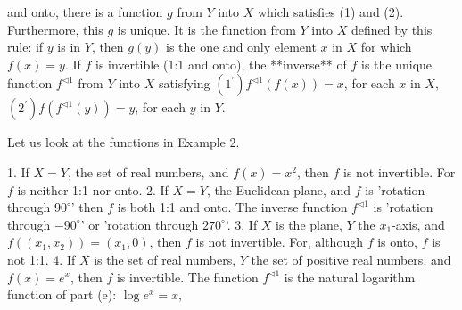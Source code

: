 and onto, there is a function \(g\) from \(Y\) into \(X\) which satisfies (1) and (2). Furthermore, this \(g\) is unique. It is the function from \(Y\) into \(X\) defined by this rule: if \(y\) is in \(Y\), then \(g(y)\) is the one and only element \(x\) in \(X\) for which \(f(x)=y\). If \(f\) is invertible (1:1 and onto), the **inverse** of \(f\) is the unique function \(f^{\lhd 1}\) from \(Y\) into \(X\) satisfying \((1^{\prime})\)\(f^{\lhd 1}(f(x))=x\), for each \(x\) in \(X\), \((2^{\prime})\)\(f(f^{\lhd 1}(y))=y\), for each \(y\) in \(Y\).

Let us look at the functions in Example 2.

1. If \(X=Y\), the set of real numbers, and \(f(x)=x^{2}\), then \(f\) is not invertible. For \(f\) is neither 1:1 nor onto.
2. If \(X=Y\), the Euclidean plane, and \(f\) is 'rotation through \(90^{\circ}\)' then \(f\) is both 1:1 and onto. The inverse function \(f^{\lhd 1}\) is 'rotation through \(-90^{\circ}\)' or 'rotation through \(270^{\circ}\)'.
3. If \(X\) is the plane, \(Y\) the \(x_{1}\)-axis, and \(f((x_{1},x_{2}))=(x_{1},0)\), then \(f\) is not invertible. For, although \(f\) is onto, \(f\) is not 1:1.
4. If \(X\) is the set of real numbers, \(Y\) the set of positive real numbers, and\(f(x)=e^{x}\), then \(f\) is invertible. The function \(f^{\lhd 1}\) is the natural logarithm function of part (e): \(\log e^{x}=x\), 